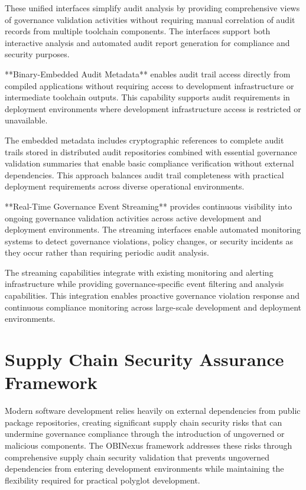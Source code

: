 These unified interfaces simplify audit analysis by providing comprehensive views of governance validation activities without requiring manual correlation of audit records from multiple toolchain components. The interfaces support both interactive analysis and automated audit report generation for compliance and security purposes.

**Binary-Embedded Audit Metadata** enables audit trail access directly from compiled applications without requiring access to development infrastructure or intermediate toolchain outputs. This capability supports audit requirements in deployment environments where development infrastructure access is restricted or unavailable.

The embedded metadata includes cryptographic references to complete audit trails stored in distributed audit repositories combined with essential governance validation summaries that enable basic compliance verification without external dependencies. This approach balances audit trail completeness with practical deployment requirements across diverse operational environments.

**Real-Time Governance Event Streaming** provides continuous visibility into ongoing governance validation activities across active development and deployment environments. The streaming interfaces enable automated monitoring systems to detect governance violations, policy changes, or security incidents as they occur rather than requiring periodic audit analysis.

The streaming capabilities integrate with existing monitoring and alerting infrastructure while providing governance-specific event filtering and analysis capabilities. This integration enables proactive governance violation response and continuous compliance monitoring across large-scale development and deployment environments.

\section{Supply Chain Security Assurance Framework}

Modern software development relies heavily on external dependencies from public package repositories, creating significant supply chain security risks that can undermine governance compliance through the introduction of ungoverned or malicious components. The OBINexus framework addresses these risks through comprehensive supply chain security validation that prevents ungoverned dependencies from entering development environments while maintaining the flexibility required for practical polyglot development.

